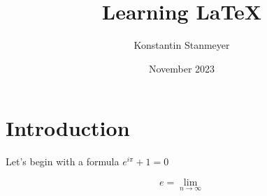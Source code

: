 \documentclass{article}
\title{Learning LaTeX}
\author{Konstantin Stanmeyer}
\date{November 2023}
\begin{document}

\section{Introduction}

Let's begin with a formula $e^{i\pi}+1=0$

$$ e= \lim_{n\to\infty} $$
\end{document}
